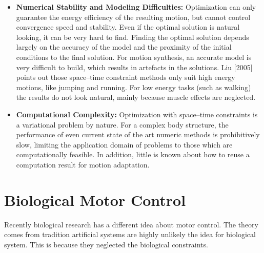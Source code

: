 \begin{itemize}
\item \textbf{Numerical Stability and Modeling Difficulties: }
Optimization can only guarantee the energy efficiency of the resulting motion, but cannot control convergence speed and stability.
Even if the optimal solution is natural looking, it can be very hard to find. Finding the optimal solution depends largely on the accuracy of the model and the proximity of the initial conditions to the final solution. For motion synthesis, an accurate model is very difficult to build, which results in artefacts in the solutions. Liu [2005] points out those space–time constraint methods only suit high energy motions, like jumping and running.
For low energy tasks (such as walking) the results do not look natural, mainly because muscle effects are neglected.

\item \textbf{Computational Complexity: }
Optimization with space–time constraints is a variational problem by nature. For a complex body structure, the performance of even current state of the art numeric methods is prohibitively slow, limiting the application domain of problems to those which are computationally feasible. In addition, little is known about how to reuse a computation result for motion adaptation.

\end{itemize}


\section{Biological Motor Control}
Recently biological research has a different idea about motor control.
The theory comes from tradition artificial systems are highly unlikely the idea for biological system. This is because they neglected the biological constraints.


